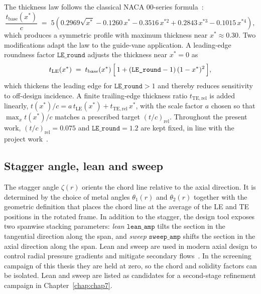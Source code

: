 The thickness law follows the classical NACA 00-series formula~\cite{Abbott1959}:
\begin{equation}
\frac{t_{\mathrm{base}}(x^*)}{c} \;=\; 5\!\left(0.2969\sqrt{x^*} - 0.1260\,x^* - 0.3516\,x^{*2} + 0.2843\,x^{*3} - 0.1015\,x^{*4}\right),
\label{eq:naca_thickness}
\end{equation}
which produces a symmetric profile with maximum thickness near $x^* \approx 0.30$. Two modifications adapt the law to the guide-vane application. A leading-edge roundness factor $\texttt{LE\_round}$ adjusts the thickness near $x^* = 0$ as
\begin{equation}
t_{\mathrm{LE}}(x^*) \;=\; t_{\mathrm{base}}(x^*)\,\Bigl[\,1 + (\texttt{LE\_round}-1)\,(1-x^*)^2\,\Bigr],
\label{eq:LE_round}
\end{equation}
which thickens the leading edge for $\texttt{LE\_round} > 1$ and thereby reduces sensitivity to off-design incidence. A finite trailing-edge thickness ratio $t_{\mathrm{TE,rel}}$ is added linearly, $t(x^*)/c = a\,t_{\mathrm{LE}}(x^*) + t_{\mathrm{TE,rel}}\,x^*$, with the scale factor $a$ chosen so that $\max_x t(x^*)/c$ matches a prescribed target $(t/c)_{\mathrm{rel}}$. Throughout the present work, $(t/c)_{\mathrm{rel}} = 0.075$ and $\texttt{LE\_round} = 1.2$ are kept fixed, in line with the project work~\cite{Leonsen2025}.
 
\subsection{Stagger angle, lean and sweep}
\label{sec:theory_stagger_lean_sweep}
 
The stagger angle $\zeta(r)$ orients the chord line relative to the axial direction. It is determined by the choice of metal angles $\theta_1(r)$ and $\theta_2(r)$ together with the geometric definition that places the chord line at the average of the LE and TE positions in the rotated frame. In addition to the stagger, the design tool exposes two spanwise stacking parameters: \emph{lean} $\texttt{lean\_amp}$ tilts the section in the tangential direction along the span, and \emph{sweep} $\texttt{sweep\_amp}$ shifts the section in the axial direction along the span. Lean and sweep are used in modern axial design to control radial pressure gradients and mitigate secondary flows~\cite{Schnoes2018}. In the screening campaign of this thesis they are held at zero, so the chord and solidity factors can be isolated. Lean and sweep are listed as candidates for a second-stage refinement campaign in Chapter~\ref{chap:chap7}.
 
